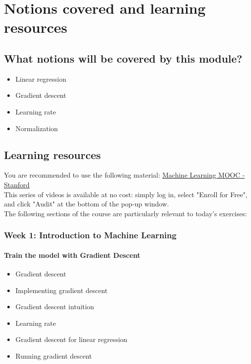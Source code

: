 


\chapter*{Notions covered and learning resources}

\section*{What notions will be covered by this module?}

\begin{itemize}
    \item Linear regression
    \item Gradient descent
    \item Learning rate
    \item Normalization
\end{itemize}

\section*{Learning resources}

You are recommended to use the following material: \href{https://www.coursera.org/learn/machine-learning}{Machine Learning MOOC - Stanford}\\
\newline
This series of videos is available at no cost: simply log in, select "Enroll for Free", and click "Audit" at the bottom of the pop-up window.\\
\newline
The following sections of the course are particularly relevant to today's exercises: 

\subsection*{Week 1: Introduction to Machine Learning}

\subsubsection*{Train the model with Gradient Descent}
\begin{itemize}
  \item Gradient descent
  \item Implementing gradient descent
  \item Gradient descent intuition
  \item Learning rate
  \item Gradient descent for linear regression
  \item Running gradient descent
\end{itemize}
    
